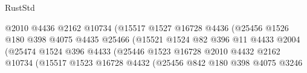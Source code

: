 \begin{lexlean}{RustStd}
\begin{coremodule}
                                                @2010
                                                @4436
                                                @2162
                                                @10734
                                                (@15517
                                                  @1527
                                                  @16728
                                                  @4436
                                                  (@25456
                                                    @1526
                                                    @180
                                                    @398
                                                    @4075
                                                    @4435
                                                    @25466
                                                    (@15521
                                                      @1524
                                                      @82
                                                      @396
                                                      @11
                                                      @4433
                                                      @2004
                                                      (@25474
                                                        @1524
                                                        @396
                                                        @4433
                                                        (@25446
                                                          @1523
                                                          @16728
                                                          @2010
                                                          @4432
                                                          @2162
                                                          @10734
                                                          (@15517
                                                            @1523
                                                            @16728
                                                            @4432
                                                            (@25456
                                                              @842
                                                              @180
                                                              @398
                                                              @4075
                                                              @3246

\end{coremodule}
\end{lexlean}
